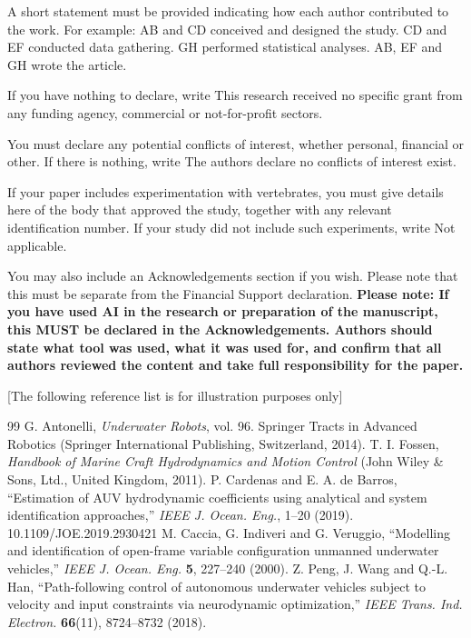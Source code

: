 \documentclass[DTMColor]{ROB-New}
\begin{document}
\begin{con}
A short statement must be provided indicating how each author contributed to the work. For example: AB and CD conceived and designed the study. CD and EF conducted data gathering. GH performed statistical analyses. AB, EF and GH wrote the article.

If you have nothing to declare, write This research received no specific grant from any funding agency, commercial or not-for-profit sectors.

You must declare any potential conflicts of interest, whether personal, financial or other. If there is nothing, write The authors declare no conflicts of interest exist.

If your paper includes experimentation with vertebrates, you must give details here of the body that approved the study, together with any relevant identification number. If your study did not include such experiments, write Not applicable.

You may also include an Acknowledgements section if you wish. Please note that this must be separate from the Financial Support declaration.
\textbf{Please note: If you have used AI in the research or preparation of the manuscript, this MUST be declared in the Acknowledgements. Authors should state what tool was used, what it was used for, and confirm that all authors reviewed the content and take full responsibility for the paper.}
\end{con}
%
\vspace{5mm} %

[The following reference list is for illustration purposes only]
\begin{thebibliography}
{99}
G. Antonelli, {\it Underwater Robots}, vol. 96. Springer Tracts in Advanced Robotics (Springer International Publishing, Switzerland, 2014).
T. I. Fossen, {\it Handbook of Marine Craft Hydrodynamics and Motion Control} (John Wiley \& Sons, Ltd., United Kingdom, 2011).
P. Cardenas and E. A. de Barros, ``Estimation of AUV hydrodynamic coefficients using analytical and system identification approaches,'' {\it IEEE J. Ocean. Eng.}, 1--20 (2019). 10.1109/JOE.2019.2930421
M. Caccia, G. Indiveri and G. Veruggio, ``Modelling and identification of open-frame variable configuration unmanned underwater vehicles,'' {\it IEEE J. Ocean. Eng.} \textbf{5}, 227--240 (2000).
Z. Peng, J. Wang and Q.-L. Han, ``Path-following control of autonomous underwater vehicles subject to velocity and input constraints via neurodynamic optimization,'' {\it IEEE Trans. Ind. Electron.} \textbf{66}(11), 8724--8732 (2018).
\end{thebibliography}
\end{document}
